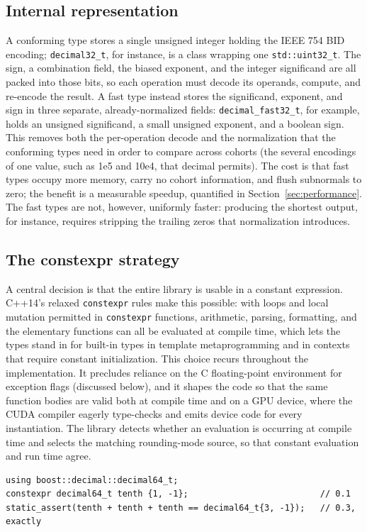 \documentclass[acmsmall]{acmart}
\begin{document}
\subsection{Internal representation}
A conforming type stores a single unsigned integer holding the IEEE 754 BID encoding;
\texttt{decimal32\_t}, for instance, is a class wrapping one \texttt{std::uint32\_t}.
The sign, a combination field, the biased exponent, and the integer significand are all
packed into those bits, so each operation must decode its operands, compute, and
re-encode the result. A fast type instead stores the significand, exponent, and sign in
three separate, already-normalized fields: \texttt{decimal\_fast32\_t}, for example,
holds an unsigned significand, a small unsigned exponent, and a boolean sign. This
removes both the per-operation decode and the normalization that the conforming types
need in order to compare across cohorts (the several encodings of one value, such as 1e5
and 10e4, that decimal permits). The cost is that fast types occupy more memory, carry
no cohort information, and flush subnormals to zero; the benefit is a measurable speedup,
quantified in Section~\ref{sec:performance}. The fast types are not, however, uniformly
faster: producing the shortest output, for instance, requires stripping the trailing
zeros that normalization introduces.

\subsection{The constexpr strategy}
A central decision is that the entire library is usable in a constant expression.
C++14's relaxed \texttt{constexpr} rules make this possible: with loops and local
mutation permitted in \texttt{constexpr} functions, arithmetic, parsing, formatting, and
the elementary functions can all be evaluated at compile time, which lets the types
stand in for built-in types in template metaprogramming and in contexts that require
constant initialization. This choice recurs throughout the implementation. It precludes
reliance on the C floating-point environment for exception flags (discussed below), and
it shapes the code so that the same function bodies are valid both at compile time and
on a GPU device, where the CUDA compiler eagerly type-checks and emits device code for
every instantiation. The library detects whether an evaluation is occurring at compile
time and selects the matching rounding-mode source, so that constant evaluation and run
time agree.

\begin{lstlisting}[caption={Decimal arithmetic in a constant expression: the sum is formed
  and checked entirely at compile time.},label={lst:constexpr}]
using boost::decimal::decimal64_t;
constexpr decimal64_t tenth {1, -1};                          // 0.1
static_assert(tenth + tenth + tenth == decimal64_t{3, -1});   // 0.3, exactly
\end{lstlisting}
\end{document}

